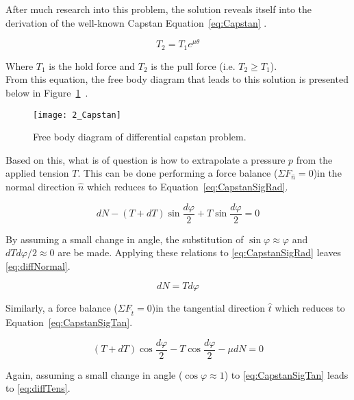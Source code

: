 After much research into this problem, the solution reveals itself into the derivation of the well-known Capstan Equation~\ref{eq:Capstan} \cite{capstanman}.

\begin{equation}
	\label{eq:Capstan}
	T_2 = T_1 e^{\mu\theta}
\end{equation}

Where $T_1$ is the hold force and $T_2$ is the pull force (i.e. $T_2 \geq T_1$). \\

From this equation, the free body diagram that leads to this solution is presented below in Figure~\ref{fig:Capstan}~\cite{capstanman}. 

\begin{figure}[H]
	\centering
	\texttt{[image: 2\_Capstan]}
	\caption{Free body diagram of differential capstan problem.}
	\label{fig:Capstan}
\end{figure}

Based on this, what is of question is how to extrapolate a pressure $p$ from the applied tension $T$. This can be done performing a force balance ($\Sigma F_{\hat{n}} = 0 $)in the normal direction $\hat{n}$ which reduces to Equation~\ref{eq:CapstanSigRad}.

\begin{equation}
	\label{eq:CapstanSigRad}
	dN-(T+dT)\sin \frac{d\varphi}{2}+T\sin \frac{d\varphi}{2}= 0
\end{equation}

By assuming a small change in angle, the substitution of $\sin \varphi \approx \varphi$ and $dT d\varphi/2 \approx 0$ are be made. Applying these relations to \ref{eq:CapstanSigRad} leaves \ref{eq:diffNormal}.

\begin{equation}
	\label{eq:diffNormal}
	dN = T d\varphi
\end{equation}


Similarly, a force balance ($\Sigma F_{\hat{t}} = 0 $)in the tangential direction $\hat{t}$ which reduces to Equation~\ref{eq:CapstanSigTan}.

\begin{equation}
	\label{eq:CapstanSigTan}
	(T+dT)\cos \frac{d\varphi}{2}- T\cos \frac{d\varphi}{2} - \mu dN= 0
\end{equation}

Again, assuming a small change in angle ($\cos \varphi \approx 1$) to \ref{eq:CapstanSigTan} leads to \ref{eq:diffTens}.

